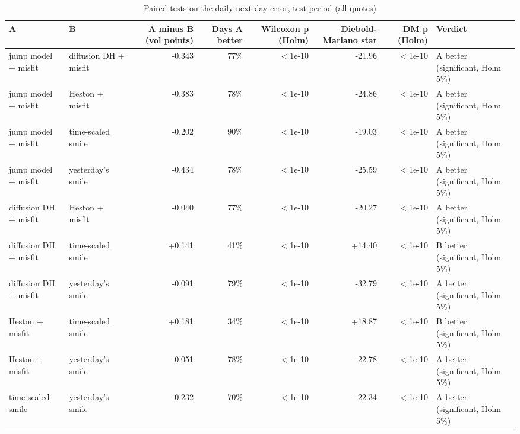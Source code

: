 \begin{table}[ht]
\centering
\small
\caption{Paired tests on the daily next-day error, test period (all quotes)}
\begin{tabular}{llrrrrrl}
\toprule
A & B & A minus B (vol points) & Days A better & Wilcoxon p (Holm) & Diebold-Mariano stat & DM p (Holm) & Verdict \\
\midrule
jump model + misfit & diffusion DH + misfit & -0.343 & 77\% & $<$1e-10 & -21.96 & $<$1e-10 & A better (significant, Holm 5\%) \\
jump model + misfit & Heston + misfit & -0.383 & 78\% & $<$1e-10 & -24.86 & $<$1e-10 & A better (significant, Holm 5\%) \\
jump model + misfit & time-scaled smile & -0.202 & 90\% & $<$1e-10 & -19.03 & $<$1e-10 & A better (significant, Holm 5\%) \\
jump model + misfit & yesterday's smile & -0.434 & 78\% & $<$1e-10 & -25.59 & $<$1e-10 & A better (significant, Holm 5\%) \\
diffusion DH + misfit & Heston + misfit & -0.040 & 77\% & $<$1e-10 & -20.27 & $<$1e-10 & A better (significant, Holm 5\%) \\
diffusion DH + misfit & time-scaled smile & +0.141 & 41\% & $<$1e-10 & +14.40 & $<$1e-10 & B better (significant, Holm 5\%) \\
diffusion DH + misfit & yesterday's smile & -0.091 & 79\% & $<$1e-10 & -32.79 & $<$1e-10 & A better (significant, Holm 5\%) \\
Heston + misfit & time-scaled smile & +0.181 & 34\% & $<$1e-10 & +18.87 & $<$1e-10 & B better (significant, Holm 5\%) \\
Heston + misfit & yesterday's smile & -0.051 & 78\% & $<$1e-10 & -22.78 & $<$1e-10 & A better (significant, Holm 5\%) \\
time-scaled smile & yesterday's smile & -0.232 & 70\% & $<$1e-10 & -22.34 & $<$1e-10 & A better (significant, Holm 5\%) \\
\bottomrule
\end{tabular}
\par{}
\end{table}
